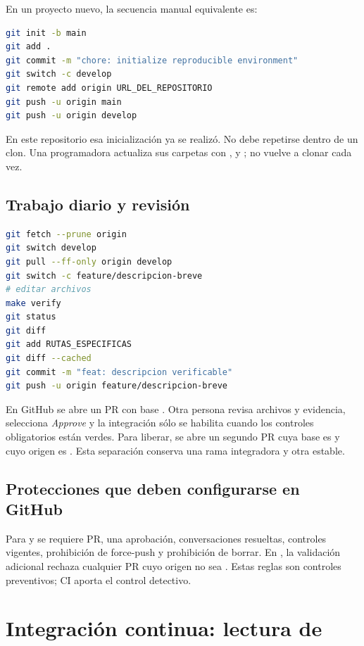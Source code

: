 En un proyecto nuevo, la secuencia manual equivalente es:

\begin{lstlisting}[style=terminal,language=bash]
git init -b main
git add .
git commit -m "chore: initialize reproducible environment"
git switch -c develop
git remote add origin URL_DEL_REPOSITORIO
git push -u origin main
git push -u origin develop
\end{lstlisting}

En este repositorio esa inicialización ya se realizó. No debe repetirse dentro de un clon. Una programadora actualiza sus carpetas con ,  y ; no vuelve a clonar cada vez.

\subsection{Trabajo diario y revisión}

\begin{lstlisting}[style=terminal,language=bash]
git fetch --prune origin
git switch develop
git pull --ff-only origin develop
git switch -c feature/descripcion-breve
# editar archivos
make verify
git status
git diff
git add RUTAS_ESPECIFICAS
git diff --cached
git commit -m "feat: descripcion verificable"
git push -u origin feature/descripcion-breve
\end{lstlisting}

En GitHub se abre un PR con base . Otra persona revisa archivos y evidencia, selecciona \emph{Approve} y la integración sólo se habilita cuando los controles obligatorios están verdes. Para liberar, se abre un segundo PR cuya base es  y cuyo origen es . Esta separación conserva una rama integradora y otra estable.

\subsection{Protecciones que deben configurarse en GitHub}

Para  y  se requiere PR, una aprobación, conversaciones resueltas, controles vigentes, prohibición de force-push y prohibición de borrar. En , la validación adicional rechaza cualquier PR cuyo origen no sea . Estas reglas son controles preventivos; CI aporta el control detectivo.

\section{Integración continua: lectura de }


